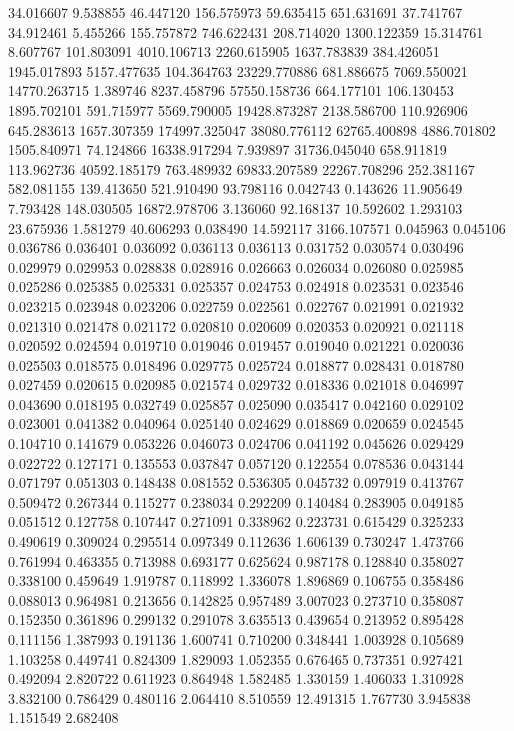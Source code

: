 34.016607
9.538855
46.447120
156.575973
59.635415
651.631691
37.741767
34.912461
5.455266
155.757872
746.622431
208.714020
1300.122359
15.314761
8.607767
101.803091
4010.106713
2260.615905
1637.783839
384.426051
1945.017893
5157.477635
104.364763
23229.770886
681.886675
7069.550021
14770.263715
1.389746
8237.458796
57550.158736
664.177101
106.130453
1895.702101
591.715977
5569.790005
19428.873287
2138.586700
110.926906
645.283613
1657.307359
174997.325047
38080.776112
62765.400898
4886.701802
1505.840971
74.124866
16338.917294
7.939897
31736.045040
658.911819
113.962736
40592.185179
763.489932
69833.207589
22267.708296
252.381167
582.081155
139.413650
521.910490
93.798116
0.042743
0.143626
11.905649
7.793428
148.030505
16872.978706
3.136060
92.168137
10.592602
1.293103
23.675936
1.581279
40.606293
0.038490
14.592117
3166.107571
0.045963
0.045106
0.036786
0.036401
0.036092
0.036113
0.036113
0.031752
0.030574
0.030496
0.029979
0.029953
0.028838
0.028916
0.026663
0.026034
0.026080
0.025985
0.025286
0.025385
0.025331
0.025357
0.024753
0.024918
0.023531
0.023546
0.023215
0.023948
0.023206
0.022759
0.022561
0.022767
0.021991
0.021932
0.021310
0.021478
0.021172
0.020810
0.020609
0.020353
0.020921
0.021118
0.020592
0.024594
0.019710
0.019046
0.019457
0.019040
0.021221
0.020036
0.025503
0.018575
0.018496
0.029775
0.025724
0.018877
0.028431
0.018780
0.027459
0.020615
0.020985
0.021574
0.029732
0.018336
0.021018
0.046997
0.043690
0.018195
0.032749
0.025857
0.025090
0.035417
0.042160
0.029102
0.023001
0.041382
0.040964
0.025140
0.024629
0.018869
0.020659
0.024545
0.104710
0.141679
0.053226
0.046073
0.024706
0.041192
0.045626
0.029429
0.022722
0.127171
0.135553
0.037847
0.057120
0.122554
0.078536
0.043144
0.071797
0.051303
0.148438
0.081552
0.536305
0.045732
0.097919
0.413767
0.509472
0.267344
0.115277
0.238034
0.292209
0.140484
0.283905
0.049185
0.051512
0.127758
0.107447
0.271091
0.338962
0.223731
0.615429
0.325233
0.490619
0.309024
0.295514
0.097349
0.112636
1.606139
0.730247
1.473766
0.761994
0.463355
0.713988
0.693177
0.625624
0.987178
0.128840
0.358027
0.338100
0.459649
1.919787
0.118992
1.336078
1.896869
0.106755
0.358486
0.088013
0.964981
0.213656
0.142825
0.957489
3.007023
0.273710
0.358087
0.152350
0.361896
0.299132
0.291078
3.635513
0.439654
0.213952
0.895428
0.111156
1.387993
0.191136
1.600741
0.710200
0.348441
1.003928
0.105689
1.103258
0.449741
0.824309
1.829093
1.052355
0.676465
0.737351
0.927421
0.492094
2.820722
0.611923
0.864948
1.582485
1.330159
1.406033
1.310928
3.832100
0.786429
0.480116
2.064410
8.510559
12.491315
1.767730
3.945838
1.151549
2.682408
